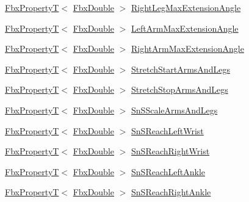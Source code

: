 \begin{DoxyCompactItemize}
\hyperlink{class_fbx_property_t}{Fbx\+PropertyT}$<$ \hyperlink{fbxtypes_8h_a171e72a1c46fc15c1a6c9c31948c1c5b}{Fbx\+Double} $>$ \hyperlink{class_fbx_character_a2eff6ef0125312f9ef47652ae70d03e9}{Right\+Leg\+Max\+Extension\+Angle}
\item 
\hyperlink{class_fbx_property_t}{Fbx\+PropertyT}$<$ \hyperlink{fbxtypes_8h_a171e72a1c46fc15c1a6c9c31948c1c5b}{Fbx\+Double} $>$ \hyperlink{class_fbx_character_a3b59fc1810376b0ace4d4489f1defd5e}{Left\+Arm\+Max\+Extension\+Angle}
\item 
\hyperlink{class_fbx_property_t}{Fbx\+PropertyT}$<$ \hyperlink{fbxtypes_8h_a171e72a1c46fc15c1a6c9c31948c1c5b}{Fbx\+Double} $>$ \hyperlink{class_fbx_character_a7de3b751867aaa9a994d93a4d209515a}{Right\+Arm\+Max\+Extension\+Angle}
\item 
\hyperlink{class_fbx_property_t}{Fbx\+PropertyT}$<$ \hyperlink{fbxtypes_8h_a171e72a1c46fc15c1a6c9c31948c1c5b}{Fbx\+Double} $>$ \hyperlink{class_fbx_character_a988aa7c18fa2e1f1f0fbd9f7a75da84d}{Stretch\+Start\+Arms\+And\+Legs}
\item 
\hyperlink{class_fbx_property_t}{Fbx\+PropertyT}$<$ \hyperlink{fbxtypes_8h_a171e72a1c46fc15c1a6c9c31948c1c5b}{Fbx\+Double} $>$ \hyperlink{class_fbx_character_a123c91c264ee326a8ae492c6f2aa5b7c}{Stretch\+Stop\+Arms\+And\+Legs}
\item 
\hyperlink{class_fbx_property_t}{Fbx\+PropertyT}$<$ \hyperlink{fbxtypes_8h_a171e72a1c46fc15c1a6c9c31948c1c5b}{Fbx\+Double} $>$ \hyperlink{class_fbx_character_a026d173105210ef46e2ba1ba1c6590ca}{Sn\+S\+Scale\+Arms\+And\+Legs}
\item 
\hyperlink{class_fbx_property_t}{Fbx\+PropertyT}$<$ \hyperlink{fbxtypes_8h_a171e72a1c46fc15c1a6c9c31948c1c5b}{Fbx\+Double} $>$ \hyperlink{class_fbx_character_ac7602d7ef2b2cb28477bbe0a52dd8f8a}{Sn\+S\+Reach\+Left\+Wrist}
\item 
\hyperlink{class_fbx_property_t}{Fbx\+PropertyT}$<$ \hyperlink{fbxtypes_8h_a171e72a1c46fc15c1a6c9c31948c1c5b}{Fbx\+Double} $>$ \hyperlink{class_fbx_character_a5525370c57690845887d0953338678df}{Sn\+S\+Reach\+Right\+Wrist}
\item 
\hyperlink{class_fbx_property_t}{Fbx\+PropertyT}$<$ \hyperlink{fbxtypes_8h_a171e72a1c46fc15c1a6c9c31948c1c5b}{Fbx\+Double} $>$ \hyperlink{class_fbx_character_af9b0d39293aad84029f2da0b26e88a97}{Sn\+S\+Reach\+Left\+Ankle}
\item 
\hyperlink{class_fbx_property_t}{Fbx\+PropertyT}$<$ \hyperlink{fbxtypes_8h_a171e72a1c46fc15c1a6c9c31948c1c5b}{Fbx\+Double} $>$ \hyperlink{class_fbx_character_a7c55eeeda37b29ec7c71c5f7ca1b9e22}{Sn\+S\+Reach\+Right\+Ankle}

\end{DoxyCompactItemize}
